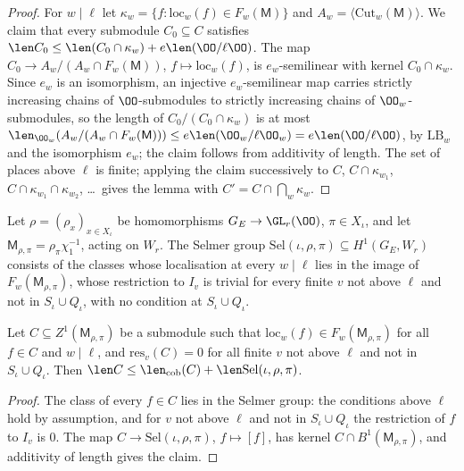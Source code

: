 \begin{proof}
For $w\mid\ell$ let $\kappa_w=\{f:\mathrm{loc}_w(f)\in F_w(\mathsf M)\}$ and $A_w=\langle\mathrm{Cut}_w(\mathsf M)\rangle$. We claim that every
submodule $C_0\subseteq C$ satisfies $\len C_0\le\len(C_0\cap\kappa_w)+e\len(\OO/\ell\OO)$. The map $C_0\to A_w/(A_w\cap F_w(\mathsf M))$,
$f\mapsto\mathrm{loc}_w(f)$, is $e_w$-semilinear with kernel $C_0\cap\kappa_w$. Since $e_w$ is an isomorphism, an injective $e_w$-semilinear map
carries strictly increasing chains of $\OO$-submodules to strictly increasing chains of $\OO_w$-submodules, so the length of $C_0/(C_0\cap\kappa_w)$
is at most $\len_{\OO_w}(A_w/(A_w\cap F_w(\mathsf M)))\le e\len(\OO_w/\ell\OO_w)=e\len(\OO/\ell\OO)$, by $\mathrm{LB}_w$ and the isomorphism $e_w$; the
claim follows from additivity of length. The set of places above $\ell$ is finite; applying the claim successively to
$C$, $C\cap\kappa_{w_1}$, $C\cap\kappa_{w_1}\cap\kappa_{w_2}$, \dots\ gives the lemma with $C'=C\cap\bigcap_w\kappa_w$.
\end{proof}

\begin{definition}\label{pf:linkN:seldef}
Let $\rho=(\rho_x)_{x\in X_\iota}$ be homomorphisms $G_E\to\GL_r(\OO)$, $\pi\in X_\iota$, and let $\mathsf M_{\rho,\pi}=\rho_\pi\chi_1^{-1}$, acting on
$W_r$. The Selmer group $\mathrm{Sel}(\iota,\rho,\pi)\subseteq H^1(G_E,W_r)$ consists of the classes whose localisation at every $w\mid\ell$ lies in
the image of $F_w(\mathsf M_{\rho,\pi})$, whose restriction to $I_v$ is trivial for every finite $v$ not above $\ell$ and not in
$S_\iota\cup Q_\iota$, with no condition at $S_\iota\cup Q_\iota$.
\end{definition}

\begin{lemma}\label{pf:linkN:selclass}
Let $C\subseteq Z^1(\mathsf M_{\rho,\pi})$ be a submodule such that $\mathrm{loc}_w(f)\in F_w(\mathsf M_{\rho,\pi})$ for all $f\in C$ and $w\mid\ell$, and
$\mathrm{res}_v(C)=0$ for all finite $v$ not above $\ell$ and not in $S_\iota\cup Q_\iota$. Then
$\len C\le\len_{\mathrm{cob}}(C)+\len\mathrm{Sel}(\iota,\rho,\pi)$.
\end{lemma}

\begin{proof}
The class of every $f\in C$ lies in the Selmer group: the conditions above $\ell$ hold by assumption, and for $v$ not above $\ell$ and not in
$S_\iota\cup Q_\iota$ the restriction of $f$ to $I_v$ is $0$. The map $C\to\mathrm{Sel}(\iota,\rho,\pi)$, $f\mapsto[f]$, has kernel
$C\cap B^1(\mathsf M_{\rho,\pi})$, and additivity of length gives the claim.
\end{proof}

